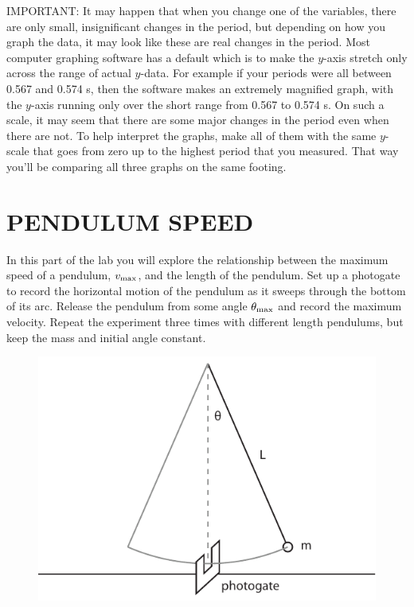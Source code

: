 \documentclass[11pt,letterpaper]{article}
\begin{document}
IMPORTANT: It may happen that when you change one of the variables, there are only small, insignificant changes in the period, but depending on how you graph the data, it may look like
these are real changes in the period. Most computer graphing software has a default which is to make the $y$-axis stretch only across the range of actual $y$-data. For example if your
periods were all between 0.567 and 0.574 s, then the software makes an extremely magnified graph, with the $y$-axis running only over the short range from 0.567 to 0.574
s. On such a scale, it may seem that there are some major changes in the period even when there are not. To help interpret the graphs, make all of them with the same $y$-scale that goes from zero up to the highest period that you measured. That way you'll be comparing all three graphs on the same footing.



\section{PENDULUM SPEED}
In this part of the lab you will explore the relationship between the maximum speed of a pendulum, $v_{\rm{max}}$, and the length of the pendulum. Set up a photogate to record the horizontal motion of the pendulum as it sweeps through the bottom of its arc. Release the pendulum from some angle $\theta_{\rm{max}}$ and record the maximum velocity. Repeat the experiment three times with different length pendulums, but keep the mass and initial angle constant.

\begin{figure}[h]
\begin{center}
\includegraphics[]{./pendulum_vmax}
\end{center}
\end{figure}
\end{document}
